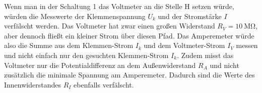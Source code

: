   \newpage

  Wenn man in der Schaltung 1 das Voltmeter an die Stelle H
  setzen würde, würden die Messwerte der Klemmenspannung $U_k$ und der
  Stromstärke $I$ verfälscht werden. Das Voltmeter hat zwar einen großen
  Widerstand $R_V = \SI{10}{\mega\ohm}$, aber dennoch fließt ein kleiner Strom
  über diesen Pfad. Das Amperemeter würde also die Summe aus dem
  Klemmen-Strom $I_k$ und dem Voltmeter-Strom $I_V$ messen und nicht einfach
  nur den gesuchten Klemmen-Strom $I_k$.
  Zudem misst das Voltmeter nur die Potentialdifferenz an dem Außenwiderstand
  $R_A$ und nicht zusätzlich die minimale Spannung am Amperemeter. Dadurch
  sind die Werte des Innenwiderstandes $R_I$ ebenfalls verfälscht.


